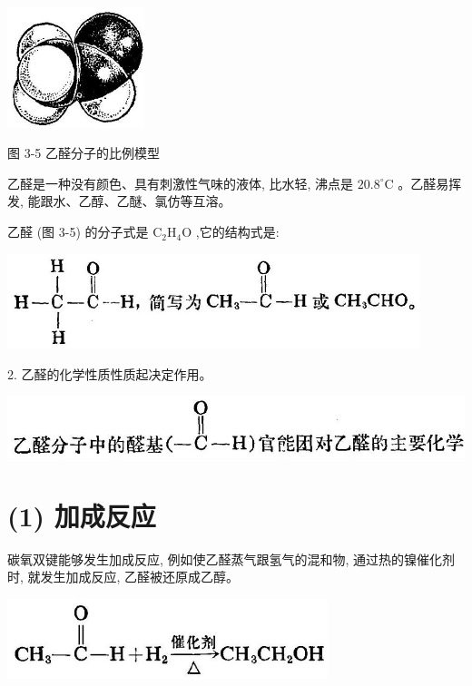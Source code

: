 \documentclass[10pt]{article}
\begin{document}
\begin{center}
\includegraphics[max width=0.3\textwidth]{images/01912d16-be99-77bb-9535-4f3ed8d9946f_126_282996.jpg}
\end{center}

图 3-5 乙醛分子的比例模型

乙醛是一种没有颜色、具有刺激性气味的液体, 比水轻, 沸点是 \({20.8}^{ \circ }\mathrm{C}\) 。乙醛易挥发, 能跟水、乙醇、乙醚、氯仿等互溶。

乙醛 (图 3-5) 的分子式是 \({\mathrm{C}}_{2}{\mathrm{H}}_{4}\mathrm{O}\) ,它的结构式是:

\begin{center}
\includegraphics[max width=0.9\textwidth]{images/01912d16-be99-77bb-9535-4f3ed8d9946f_126_447458.jpg}
\end{center}

2. 乙醛的化学性质性质起决定作用。

\begin{center}
\includegraphics[max width=1.0\textwidth]{images/01912d16-be99-77bb-9535-4f3ed8d9946f_126_990234.jpg}
\end{center}

\section*{(1) 加成反应}

碳氧双键能够发生加成反应, 例如使乙醛蒸气跟氢气的混和物, 通过热的镍催化剂时, 就发生加成反应, 乙醛被还原成乙醇。

\begin{center}
\includegraphics[max width=0.7\textwidth]{images/01912d16-be99-77bb-9535-4f3ed8d9946f_127_561276.jpg}
\end{center}
\end{document}
